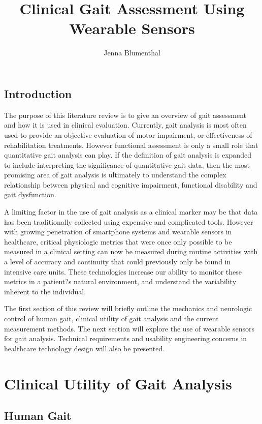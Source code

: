 \documentclass[11pt, oneside]{report}   	%
\title{Clinical Gait Assessment Using Wearable Sensors}
\author{Jenna Blumenthal}
\begin{document}

\maketitle
\pagebreak

\section*{Introduction}

The purpose of this literature review is to give an overview of gait assessment and how it is used in clinical evaluation. Currently, gait analysis is most often used to provide an objective evaluation of motor impairment, or effectiveness of rehabilitation treatments. However functional assessment is only a small role that quantitative gait analysis can play. If the definition of gait analysis is expanded to include interpreting the significance of quantitative gait data, then the most promising area of gait analysis is ultimately to understand the complex relationship between physical and cognitive impairment, functional disability and gait dysfunction\cite{JoelA.DeLisa1998}.

A limiting factor in the use of gait analysis as a clinical marker may be that data has been traditionally collected using expensive and complicated tools. However with growing penetration of smartphone systems and wearable sensors in healthcare, critical physiologic metrics that were once only possible to be measured in a clinical setting can now be measured during routine activities with a level of accuracy and continuity that could previously only be found in intensive care units. These technologies increase our ability to monitor these metrics in a patient?s natural environment, and understand the variability inherent to the individual.

The first section of this review will briefly outline the mechanics and neurologic control of human gait, clinical utility of gait analysis and the current measurement methods. The next section will explore the use of wearable sensors for gait analysis. Technical requirements and usability engineering concerns in healthcare technology design will also be presented.

\pagebreak

\chapter{Clinical Utility of Gait Analysis}

\section{Human Gait}
\end{document}
